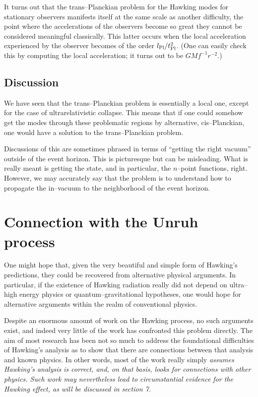 It turns out that the trans--Planckian problem for the Hawking modes
for stationary observers manifests itself at the same scale as another
difficulty, the point where the accelerations
of the observers become so great they
cannot be considered meaningful classically.  This latter occurs when
the local acceleration experienced by the observer becomes of the
order $l_{\rm Pl}/t_{\rm Pl}^2$.  (One can easily check this by
computing the local acceleration; it turns out to be
$GMf^{-1}r^{-2}$.)


\subsection{Discussion}

We have seen that the trans--Planckian problem is essentially a local one,
except for the case of ultrarelativistic collapse.  This means that if one
could somehow get the modes through these problematic regions by alternative,
cis--Planckian, one would have a solution to the trans--Planckian problem.  

Discussions of this are sometimes phrased in terms of ``getting the right
vacuum'' outside of the event horizon.  This is picturesque but can be
misleading.  What is really meant is getting the state, and in particular, the
$n$--point functions, right.  However, we may accurately say that the problem
is  to understand how to propagate the in--vacuum to the neighborhood of the
event horizon.

\section{Connection with the Unruh process}

One might hope that, given the very beautiful and simple form of Hawking's
predictions, they could be recovered from alternative physical arguments.  In
particular, if the existence of Hawking radiation really did not depend on
ultra--high energy physics or quantum--gravitational hypotheses, one would hope
for alternative arguments within the realm of conventional physics.

Despite an enormous amount of work on the Hawking process, no such arguments
exist, and indeed very little of the work has confronted this problem directly.
The aim of most research has been not so much to address the foundational
difficulties of Hawking's analysis as to show that there are connections
between that analysis and  known physics.   In other words, most of the work
really simply \it assumes \rm Hawking's analysis is correct, and, on that
basis, looks for connections with other physics.  Such work may nevertheless
lead to circumstantial evidence for the Hawking effect, as will be discussed in
section 7.

